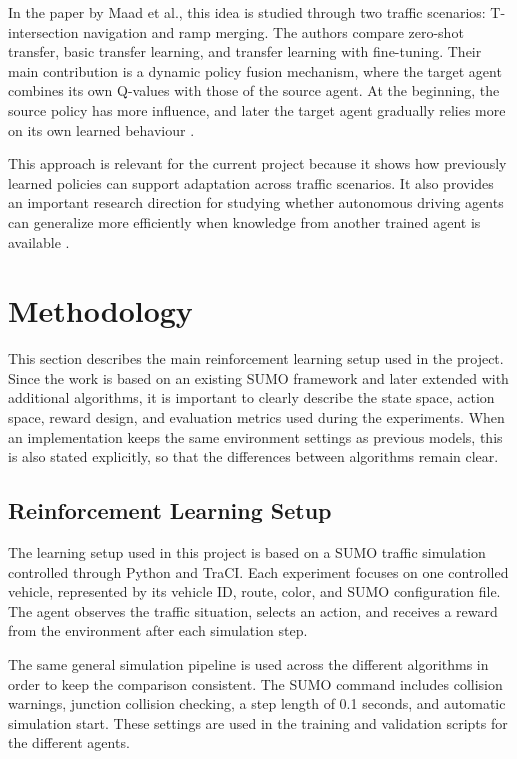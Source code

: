 \documentclass{article}
\begin{document}
In the paper by Maad et al., this idea is studied through two traffic scenarios: T-intersection navigation and ramp merging. The authors compare zero-shot transfer, basic transfer learning, and transfer learning with fine-tuning. Their main contribution is a dynamic policy fusion mechanism, where the target agent combines its own Q-values with those of the source agent. At the beginning, the source policy has more influence, and later the target agent gradually relies more on its own learned behaviour \cite{maad2025dynamic}.

This approach is relevant for the current project because it shows how previously learned policies can support adaptation across traffic scenarios. It also provides an important research direction for studying whether autonomous driving agents can generalize more efficiently when knowledge from another trained agent is available \cite{maad2025dynamic}.

\section{Methodology}
This section describes the main reinforcement learning setup used in the project. Since the work is based on an existing SUMO framework and later extended with additional algorithms, it is important to clearly describe the state space, action space, reward design, and evaluation metrics used during the experiments. When an implementation keeps the same environment settings as previous models, this is also stated explicitly, so that the differences between algorithms remain clear.

\subsection{Reinforcement Learning Setup}

The learning setup used in this project is based on a SUMO traffic simulation controlled through Python and TraCI. Each experiment focuses on one controlled vehicle, represented by its vehicle ID, route, color, and SUMO configuration file. The agent observes the traffic situation, selects an action, and receives a reward from the environment after each simulation step.

The same general simulation pipeline is used across the different algorithms in order to keep the comparison consistent. The SUMO command includes collision warnings, junction collision checking, a step length of 0.1 seconds, and automatic simulation start. These settings are used in the training and validation scripts for the different agents.
\end{document}
